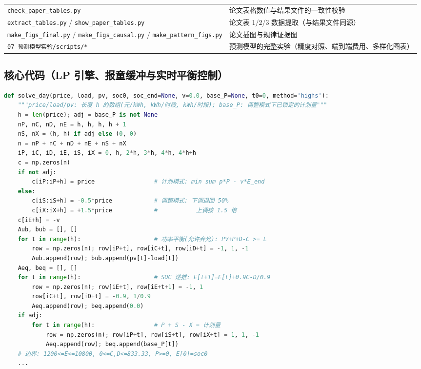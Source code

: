 \documentclass[12pt,a4paper,fontset=fandol]{ctexart}
\begin{document}
\begin{table}[htbp]
\begin{tabularx}{\textwidth}{@{}p{4.6cm}X@{}}
\texttt{check\_paper\_tables.py} & 论文表格数值与结果文件的一致性校验 \\
\texttt{extract\_tables.py} / \texttt{show\_paper\_tables.py} & 论文表 1/2/3 数据提取（与结果文件同源\nobreak） \\
\texttt{make\_figs\_final.py} / \texttt{make\_figs\_causal.py} / \texttt{make\_pattern\_figs.py} & 论文插图与规律证据图 \\
\texttt{07\_预测模型实验/scripts/*} & 预测模型的完整实验（精度对照\nobreak、端到端费用\nobreak、多样化图表\nobreak） \\
\bottomrule
\end{tabularx}
\end{table}

\subsection{核心代码（LP 引擎\nobreak、报童缓冲与实时平衡控制\nobreak）}

\begin{lstlisting}[language=Python, caption={单日 LP 引擎（节选：计划模式与调整模式的目标、约束装配）}]
def solve_day(price, load, pv, soc0, soc_end=None, v=0.0, base_P=None, t0=0, method='highs'):
    """price/load/pv: 长度 h 的数组(元/kWh, kWh/时段, kWh/时段); base_P: 调整模式下已锁定的计划量"""
    h = len(price); adj = base_P is not None
    nP, nC, nD, nE = h, h, h, h + 1
    nS, nX = (h, h) if adj else (0, 0)
    n = nP + nC + nD + nE + nS + nX
    iP, iC, iD, iE, iS, iX = 0, h, 2*h, 3*h, 4*h, 4*h+h
    c = np.zeros(n)
    if not adj:
        c[iP:iP+h] = price                 # 计划模式: min sum p*P - v*E_end
    else:
        c[iS:iS+h] = -0.5*price            # 调整模式: 下调退回 50%
        c[iX:iX+h] = +1.5*price            #           上调按 1.5 倍
    c[iE+h] = -v
    Aub, bub = [], []
    for t in range(h):                     # 功率平衡(允许弃光): PV+P+D-C >= L
        row = np.zeros(n); row[iP+t], row[iC+t], row[iD+t] = -1, 1, -1
        Aub.append(row); bub.append(pv[t]-load[t])
    Aeq, beq = [], []
    for t in range(h):                     # SOC 递推: E[t+1]=E[t]+0.9C-D/0.9
        row = np.zeros(n); row[iE+t], row[iE+t+1] = -1, 1
        row[iC+t], row[iD+t] = -0.9, 1/0.9
        Aeq.append(row); beq.append(0.0)
    if adj:
        for t in range(h):                 # P + S - X = 计划量
            row = np.zeros(n); row[iP+t], row[iS+t], row[iX+t] = 1, 1, -1
            Aeq.append(row); beq.append(base_P[t])
    # 边界: 1200<=E<=10800, 0<=C,D<=833.33, P>=0, E[0]=soc0
    ...
\end{lstlisting}
\end{document}
